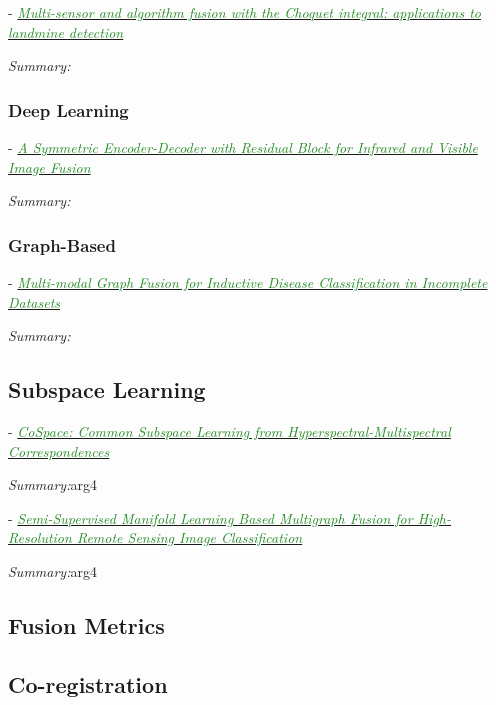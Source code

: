 \documentclass[]{article}
\newcommand{\paperentry}[4]{
            \hangindent=1cm
            \cite{#1} - \href{run:../References/#3}{\textcolor{ForestGreen}{\textit{#2}}}
            
            \noindent            
            \begin{minipage}[t]{0.1\linewidth}\hfill\end{minipage}
            \begin{minipage}[t]{0.8\linewidth}\textcolor{NavyBlue}{{\textit{Summary:}}}#4\end{minipage}
            \vspace{.25cm}
          }
\begin{document}
			\paperentry{Gader2004ChoquetIntegralLandmine}
			{Multi-sensor and algorithm fusion with the Choquet integral: applications to landmine detection}
			{Fusion/Choquet/Gader2004ChoquetIntegralLandmine.pdf}
			{}
			
			
			
		
		\subsubsection{Deep Learning}
		
			\paperentry{Jian2019AEInfraredVisibleFusion}
			{A Symmetric Encoder-Decoder with Residual Block for Infrared and Visible Image Fusion}
			{Fusion/DeepLearning/Jian2019AEInfraredVisibleFusion.pdf}
			{}
		
		\subsubsection{Graph-Based}
		
			\paperentry{Vivar2019MultiModalGraphFusion}
			{Multi-modal Graph Fusion for Inductive Disease Classification in Incomplete Datasets}
			{Fusion/GraphBased/Vivar2019MultiModalGraphFusion.pdf}
			{}
	\subsection{Subspace Learning}
	
		\paperentry{Hong2018CommonSubspaceLearningHSI}
		{CoSpace: Common Subspace Learning from Hyperspectral-Multispectral Correspondences}
		{Fusion/SubspaceLearning/Hong2018CommonSubspaceLearningHSI.pdf}
		{arg4}
		
		\paperentry{Zhang2014SemiSupManLearningFusion}
		{Semi-Supervised Manifold Learning Based Multigraph Fusion for High-Resolution Remote Sensing Image Classification}
		{Fusion/SubspaceLearning/Zhang2014SemiSupManLearningFusion.pdf}
		{arg4}
		
	\subsection{Fusion Metrics}

	\subsection{Co-registration}
	
\end{document}
